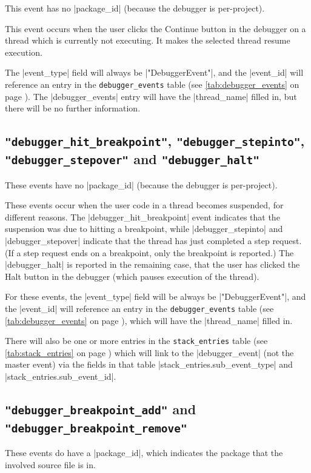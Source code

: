 \documentclass{report}
\newcommand{\myref}[1]{\autoref{#1} on page \pageref*{#1}}
\newcommand{\tabref}[1]{\lstinline|#1| table (see \myref{tab:#1})}
\begin{document}
This event has no |package_id| (because the debugger is per-project).

This event occurs when the user clicks the Continue button in the debugger on
a thread which is currently not executing.
It makes the selected thread resume execution.  

The |event_type| field will always be |"DebuggerEvent"|, and the |event_id| will
reference an entry in the \tabref{debugger_events}.  The |debugger_events|
entry will have the |thread_name| filled in, but there will be no further information.

\subsection{\lstinline!"debugger_hit_breakpoint"!, \lstinline!"debugger_stepinto"!,\\ \lstinline!"debugger_stepover"! and \lstinline!"debugger_halt"!}

These events have no |package_id| (because the debugger is per-project).

These events occur when the user code in a thread becomes suspended, for
different reasons.  The
|debugger_hit_breakpoint| event indicates that the suspension was due to
hitting a breakpoint, while |debugger_stepinto| and |debugger_stepover|
indicate that the thread has just completed a step request.  (If a step
request ends on a breakpoint, only the breakpoint is reported.)  The
|debugger_halt| is reported in the remaining case, that the user has
clicked the Halt button in the debugger (which pauses execution of the thread).

For these events, the |event_type| field will be always be |"DebuggerEvent"|,
and the |event_id| will reference an entry in the \tabref{debugger_events},
which will have the |thread_name| filled in.

There will also be one or more entries in the \tabref{stack_entries} which
will link to the |debugger_event| (not the master event) via the fields in
that table
|stack_entries.sub_event_type| and |stack_entries.sub_event_id|.

\subsection{\lstinline!"debugger_breakpoint_add"! and \lstinline!"debugger_breakpoint_remove"!}

These events do have a |package_id|, which indicates the package that the
involved source file is in.
\end{document}
